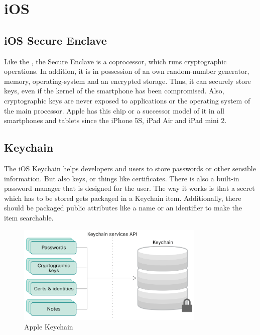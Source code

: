 \documentclass[12pt,oneside,a4paper,parskip]{scrbook}
\begin{document}

\section{iOS}

\subsection{iOS Secure Enclave}
\label{subsec:sec_enclave}

Like the , the Secure Enclave is a coprocessor, which runs cryptographic operations. In addition, it is in possession of an own random-number generator, memory, operating-system and an encrypted storage. Thus, it can securely store keys, even if the kernel of the smartphone has been compromised. Also, cryptographic keys are never exposed to applications or the operating system of the main processor. Apple has this chip or a successor model of it in all smartphones and tablets since the iPhone 5S, iPad Air and iPad mini 2.
\parencite{apple_storing_2020} 

\subsection{Keychain}
The iOS Keychain helps developers and users to store passwords or other sensible information. But also keys, or things like certificates. There is also a built-in password manager that is designed for the user. The way it works is that a secret which has to be stored gets packaged in a Keychain item. Additionally, there should be packaged public attributes like a name or an identifier to make the item searchable. 

\begin{figure}[ht]
  \centering
  \includegraphics[width=0.8\textwidth]{ressources/apple_keychain.png}
  \caption{Apple Keychain \parencite{apple_keychain_2020}}
  \label{apple:keychain}
\end{figure}
\end{document}

